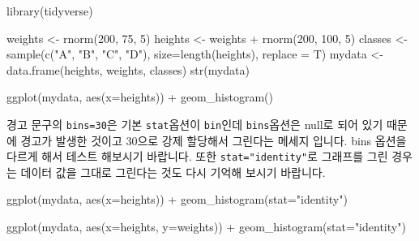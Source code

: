 \documentclass[
]{book}
\newenvironment{Shaded}{\begin{snugshade}}{\end{snugshade}}
\newcommand{\AttributeTok}[1]{\textcolor[rgb]{0.77,0.63,0.00}{#1}}
\newcommand{\DecValTok}[1]{\textcolor[rgb]{0.00,0.00,0.81}{#1}}
\newcommand{\FunctionTok}[1]{\textcolor[rgb]{0.00,0.00,0.00}{#1}}
\newcommand{\NormalTok}[1]{#1}
\newcommand{\OtherTok}[1]{\textcolor[rgb]{0.56,0.35,0.01}{#1}}
\newcommand{\SpecialCharTok}[1]{\textcolor[rgb]{0.00,0.00,0.00}{#1}}
\newcommand{\StringTok}[1]{\textcolor[rgb]{0.31,0.60,0.02}{#1}}
\begin{document}
\begin{Shaded}
\begin{Highlighting}[]
\FunctionTok{library}\NormalTok{(tidyverse)}

\NormalTok{weights }\OtherTok{\textless{}{-}} \FunctionTok{rnorm}\NormalTok{(}\DecValTok{200}\NormalTok{, }\DecValTok{75}\NormalTok{, }\DecValTok{5}\NormalTok{)}
\NormalTok{heights }\OtherTok{\textless{}{-}}\NormalTok{ weights }\SpecialCharTok{+} \FunctionTok{rnorm}\NormalTok{(}\DecValTok{200}\NormalTok{, }\DecValTok{100}\NormalTok{, }\DecValTok{5}\NormalTok{)}
\NormalTok{classes }\OtherTok{\textless{}{-}} \FunctionTok{sample}\NormalTok{(}\FunctionTok{c}\NormalTok{(}\StringTok{"A"}\NormalTok{, }\StringTok{"B"}\NormalTok{, }\StringTok{"C"}\NormalTok{, }\StringTok{"D"}\NormalTok{), }\AttributeTok{size=}\FunctionTok{length}\NormalTok{(heights), }\AttributeTok{replace =}\NormalTok{ T)}
\NormalTok{mydata }\OtherTok{\textless{}{-}} \FunctionTok{data.frame}\NormalTok{(heights, weights, classes)}
\FunctionTok{str}\NormalTok{(mydata)}

\FunctionTok{ggplot}\NormalTok{(mydata, }\FunctionTok{aes}\NormalTok{(}\AttributeTok{x=}\NormalTok{heights)) }\SpecialCharTok{+}
  \FunctionTok{geom\_histogram}\NormalTok{()}
\end{Highlighting}
\end{Shaded}

경고 문구의 \texttt{bins=30}은 기본 \texttt{stat}옵션이 \texttt{bin}인데 \texttt{bins}옵션은 null로 되어 있기 때문에 경고가 발생한 것이고 30으로 강제 할당해서 그린다는 메세지 입니다. bins 옵션을 다르게 해서 테스트 해보시기 바랍니다. 또한 \texttt{stat="identity"}로 그래프를 그린 경우는 데이터 값을 그대로 그린다는 것도 다시 기억해 보시기 바랍니다.

\begin{Shaded}
\begin{Highlighting}[]
\FunctionTok{ggplot}\NormalTok{(mydata, }\FunctionTok{aes}\NormalTok{(}\AttributeTok{x=}\NormalTok{heights)) }\SpecialCharTok{+}
  \FunctionTok{geom\_histogram}\NormalTok{(}\AttributeTok{stat=}\StringTok{"identity"}\NormalTok{)}

\FunctionTok{ggplot}\NormalTok{(mydata, }\FunctionTok{aes}\NormalTok{(}\AttributeTok{x=}\NormalTok{heights, }\AttributeTok{y=}\NormalTok{weights)) }\SpecialCharTok{+}
  \FunctionTok{geom\_histogram}\NormalTok{(}\AttributeTok{stat=}\StringTok{"identity"}\NormalTok{)}
\end{Highlighting}
\end{Shaded}
\end{document}
